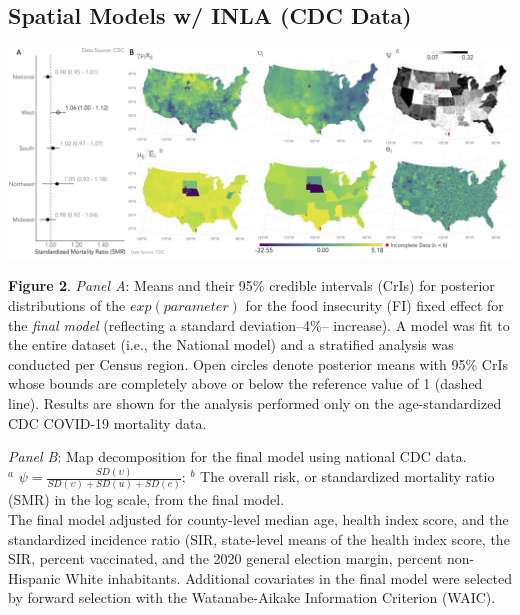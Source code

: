\documentclass{beamer}
\begin{document}
\subsection{Spatial Models w/ INLA (CDC Data)}
\begin{frame}
	
	
	
	\vspace*{-0.04 cm}
	\hspace*{-0.45 cm}
	\includegraphics[scale=0.152]{images-logos/combo-forest-map-decomp-cdc.png}
	
	\raggedright
	\tiny{\textbf{Figure 2}. \textit{Panel A}: Means and their 95\% credible intervals (CrIs) for posterior distributions of the $exp(parameter)$ for the food insecurity (FI) fixed effect for the \textit{final model} (reflecting a standard deviation--4\%-- increase). A model was fit to the entire dataset (i.e., the National model) and a stratified analysis was conducted per Census region. Open circles denote posterior means with 95\% CrIs whose bounds are completely above or below the reference value of 1 (dashed line). Results are shown for the analysis performed only on the age-standardized CDC COVID-19 mortality data. 
		
		\vspace{0.25cm}
		
		\textit{Panel B}: Map decomposition for the final model using national CDC data.\\
		$^a$ $\psi=\frac{SD(\upsilon)}{SD(\upsilon)+SD(u)+SD(e)}$;
		$^b$ The overall risk, or standardized mortality ratio (SMR) in the log scale, from the final model.\\
		The final model adjusted for county-level median age, health index score, and the standardized incidence ratio (SIR, state-level means of the health index score, the SIR, percent vaccinated, and the 2020 general election margin, percent non-Hispanic White inhabitants. Additional covariates in the final model were selected by forward selection with the Watanabe-Aikake Information Criterion (WAIC).}
	
	
\end{frame}
\end{document}
